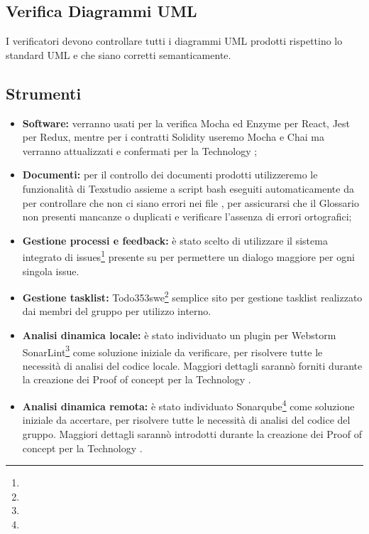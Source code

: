 \documentclass[NormeDiProgetto.tex]{subfiles}
\begin{document}
	\subsection{Verifica Diagrammi UML}
	I verificatori devono controllare tutti i diagrammi UML prodotti rispettino lo standard UML e che siano corretti semanticamente.
	
	\subsection{Strumenti}
	\begin{itemize}
		\item \textbf{Software:} verranno usati per la verifica Mocha ed Enzyme per React, Jest per Redux, mentre per i contratti Solidity useremo Mocha e Chai ma verranno attualizzati e confermati per la Technology ;
		\item \textbf{Documenti:} per il controllo dei documenti prodotti utilizzeremo le funzionalità di Texstudio assieme a script bash eseguiti automaticamente da  per controllare che non ci siano errori nei file , per assicurarsi che il Glossario non presenti mancanze o duplicati e verificare l'assenza di errori ortografici;
		\item \textbf{Gestione processi e feedback:} è stato scelto di utilizzare il sistema integrato di issues\footnote{} presente su  per permettere un dialogo maggiore per ogni singola issue. 
		\item \textbf{Gestione tasklist:} Todo353swe\footnote{} semplice sito per gestione tasklist realizzato dai membri del gruppo per utilizzo interno.
		\item \textbf{Analisi dinamica locale:} è stato individuato un plugin per Webstorm SonarLint\footnote{} come soluzione iniziale da verificare, per risolvere tutte le necessità di analisi del codice locale. Maggiori dettagli sarannò forniti durante la creazione dei Proof of concept per la Technology .
		\item \textbf{Analisi dinamica remota:} è stato individuato Sonarqube\footnote{} come soluzione iniziale da accertare, per risolvere tutte le necessità di analisi del codice del gruppo. Maggiori dettagli sarannò introdotti durante la creazione dei Proof of concept per la Technology .
	\end{itemize}
\end{document}
